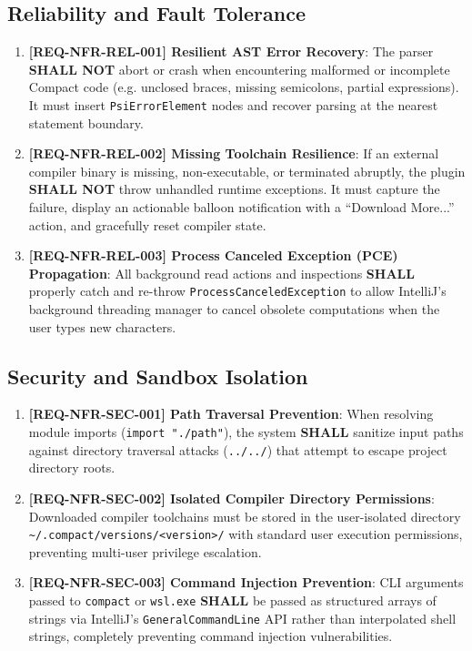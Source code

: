 \subsection{Reliability and Fault Tolerance}
\label{sec:reliability}

\begin{enumerate}
    \item \textbf{[REQ-NFR-REL-001] Resilient AST Error Recovery}:
    The parser \textbf{SHALL NOT} abort or crash when encountering malformed or incomplete Compact code (e.g. unclosed braces, missing semicolons, partial expressions). It must insert \texttt{PsiErrorElement} nodes and recover parsing at the nearest statement boundary.
    
    \item \textbf{[REQ-NFR-REL-002] Missing Toolchain Resilience}:
    If an external compiler binary is missing, non-executable, or terminated abruptly, the plugin \textbf{SHALL NOT} throw unhandled runtime exceptions. It must capture the failure, display an actionable balloon notification with a ``Download More...'' action, and gracefully reset compiler state.
    
    \item \textbf{[REQ-NFR-REL-003] Process Canceled Exception (PCE) Propagation}:
    All background read actions and inspections \textbf{SHALL} properly catch and re-throw \texttt{ProcessCanceledException} to allow IntelliJ's background threading manager to cancel obsolete computations when the user types new characters.
\end{enumerate}

\subsection{Security and Sandbox Isolation}
\label{sec:security}

\begin{enumerate}
    \item \textbf{[REQ-NFR-SEC-001] Path Traversal Prevention}:
    When resolving module imports (\texttt{import "./path"}), the system \textbf{SHALL} sanitize input paths against directory traversal attacks (\texttt{../../}) that attempt to escape project directory roots.
    
    \item \textbf{[REQ-NFR-SEC-002] Isolated Compiler Directory Permissions}:
    Downloaded compiler toolchains must be stored in the user-isolated directory \texttt{\textasciitilde/.compact/versions/<version>/} with standard user execution permissions, preventing multi-user privilege escalation.
    
    \item \textbf{[REQ-NFR-SEC-003] Command Injection Prevention}:
    CLI arguments passed to \texttt{compact} or \texttt{wsl.exe} \textbf{SHALL} be passed as structured arrays of strings via IntelliJ's \texttt{GeneralCommandLine} API rather than interpolated shell strings, completely preventing command injection vulnerabilities.
\end{enumerate}

